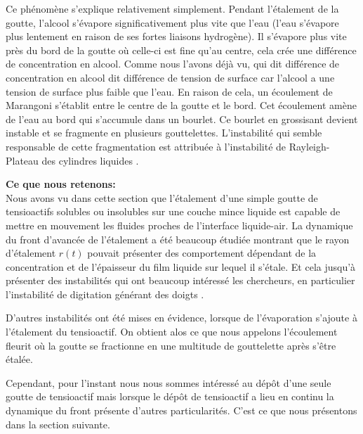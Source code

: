 Ce phénomène s'explique relativement simplement. Pendant l'étalement de la goutte, l'alcool s'évapore significativement plus vite que l'eau (l'eau s'évapore plus lentement en raison de ses fortes liaisons hydrogène). Il s'évapore plus vite près du bord de la goutte où celle-ci est fine qu'au centre, cela crée une différence de concentration en alcool. Comme nous l'avons déjà vu, qui dit différence de concentration en alcool dit différence de tension de surface car l'alcool a une tension de surface plus faible que l'eau. En raison de cela, un écoulement de Marangoni s'établit entre le centre de la goutte et le bord. Cet écoulement amène de l'eau  au bord qui s'accumule dans un bourlet. Ce bourlet en grossisant devient instable et se fragmente en plusieurs gouttelettes. L'instabilité qui semble responsable de cette fragmentation est attribuée à l'instabilité de Rayleigh-Plateau des cylindres liquides \cite{DeGennes2005}.

\begin{ombreremarque}
  \begin{remarque}
    \noindent \textbf{Ce que nous retenons:}\\
    Nous avons vu dans cette section que l'étalement d'une simple goutte de tensioactifs solubles ou insolubles sur une couche mince liquide est capable de mettre en mouvement les fluides proches de l'interface liquide-air. La dynamique du front d'avancée de l'étalement a été beaucoup étudiée montrant que le rayon d'étalement $r(t)$ pouvait présenter des comportement dépendant de la concentration et de l'épaisseur du film liquide sur lequel il s'étale. Et cela jusqu'à présenter des instabilités qui ont beaucoup intéressé les chercheurs, en particulier l'instabilité de digitation générant des \og doigts \fg. 
    
    D'autres instabilités ont été mises en évidence, lorsque de l'évaporation s'ajoute à l'étalement du tensioactif. On obtient alos ce que nous appelons l'écoulement fleurit où la goutte se fractionne en une multitude de gouttelette après s'être étalée.
    
    Cependant, pour l'instant nous nous sommes intéressé au dépôt d'une seule goutte de tensioactif mais lorsque le dépôt de tensioactif a lieu en continu la dynamique du front présente d'autres particularités. C'est ce que nous présentons dans la section suivante. 
  \end{remarque}
\end{ombreremarque}

